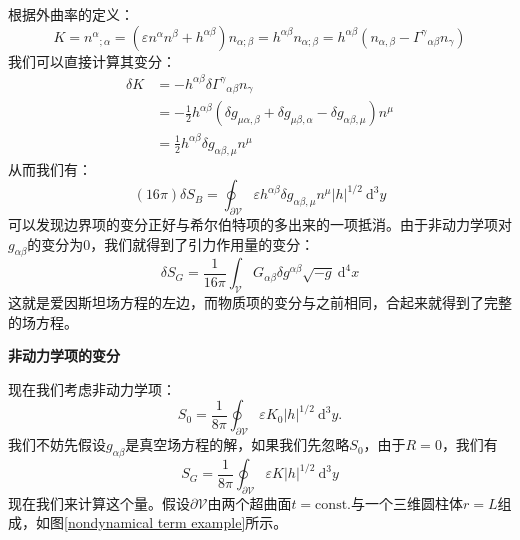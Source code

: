 \documentclass[hyperref, UTF8, a4paper]{ctexart}
\begin{document}
根据外曲率的定义：
\begin{equation*}
	K=n^{\alpha }{}_{;\alpha } =(\varepsilon n^{\alpha } n^{\beta } +h^{\alpha \beta } )n_{\alpha ;\beta } =h^{\alpha \beta } n_{\alpha ;\beta } =h^{\alpha \beta } (n_{\alpha ,\beta } -\Gamma ^{\gamma }{}_{\alpha \beta } n_{\gamma } )
\end{equation*}
我们可以直接计算其变分：
\begin{equation*}
	\begin{aligned}
		\delta K & =-h^{\alpha \beta } \delta \Gamma ^{\gamma }{}_{\alpha \beta } n_{\gamma }\\
		& =-\frac{1}{2} h^{\alpha \beta }( \delta g_{\mu \alpha ,\beta } +\delta g_{\mu \beta ,\alpha } -\delta g_{\alpha \beta ,\mu }) n^{\mu }\\
		& =\frac{1}{2} h^{\alpha \beta } \delta g_{\alpha \beta ,\mu } n^{\mu }
	\end{aligned}
\end{equation*}
从而我们有：
\begin{equation*}
	(16\pi )\delta S_{B} =\oint _{\partial \mathscr{V}} \varepsilon h^{\alpha \beta } \delta g_{\alpha \beta ,\mu } n^{\mu } |h|^{1/2} \ \mathrm{d}^{3} y
\end{equation*}
可以发现边界项的变分正好与希尔伯特项的多出来的一项抵消。由于非动力学项对$g_{\alpha \beta }$的变分为0，我们就得到了引力作用量的变分：
\begin{equation*}
	\delta S_{G} =\frac{1}{16\pi }\int _{\mathscr{V}} G_{\alpha \beta } \delta g^{\alpha \beta }\sqrt{-g} \ \mathrm{d}^{4} x
\end{equation*}
这就是爱因斯坦场方程的左边，而物质项的变分与之前相同，合起来就得到了完整的场方程。



\textbf{非动力学项的变分}

现在我们考虑非动力学项：
\begin{equation*}
	S_{0} =\frac{1}{8\pi }\oint _{\partial \mathscr{V}} \varepsilon K_{0} |h|^{1/2} \ \mathrm{d}^{3} y.
\end{equation*}
我们不妨先假设$g_{\alpha \beta }$是真空场方程的解，如果我们先忽略$S_{0}$，由于$R=0$，我们有
\begin{equation*}
	S_{G} =\frac{1}{8\pi }\oint _{\partial \mathscr{V}} \varepsilon K|h|^{1/2} \ \mathrm{d}^{3} y
\end{equation*}
现在我们来计算这个量。假设$\partial \mathscr{V}$由两个超曲面$t=\mathrm{const.}$与一个三维圆柱体$r=L$组成，如图\ref{nondynamical term example}所示。
\end{document}

